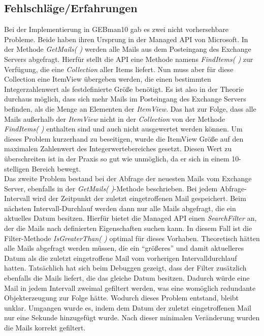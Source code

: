 \subsection{Fehlschläge/Erfahrungen}
\noindent
Bei der Implementierung in GEBman10 gab es zwei nicht vorhersehbare Probleme. Beide haben ihren Ursprung in der Managed API von Microsoft. In der Methode \textit{GetMails( )} werden alle Mails aus dem Posteingang des Exchange Servers abgefragt. Hierfür stellt die API eine Methode namens \textit{FindItems( )} zur Verfügung, die eine \textit{Collection} aller Items liefert. Nun muss aber für diese Collection eine ItemView übergeben werden, die einen bestimmten Integerzahlenwert als festdefinierte Größe benötigt. Es ist also in der Theorie durchaus möglich, dass sich mehr Mails im Posteingang des Exchange Servers befinden, als die Menge an Elementen der \textit{ItemView}. Das hat zur Folge, dass alle Mails außerhalb der \textit{ItemView} nicht in der \textit{Collection} von der Methode \textit{FindItems( )} enthalten sind und auch nicht ausgewertet werden können. Um dieses Problem kurzerhand zu beseitigen, wurde die ItemView Größe auf den maximalen Zahlenwert des Integerwertebereiches gesetzt. Diesen Wert zu überschreiten ist in der Praxis so gut wie unmöglich, da er sich in einem 10-stelligen Bereich bewegt.\\

\noindent
Das zweite Problem bestand bei der Abfrage der neuesten Mails vom Exchange Server, ebenfalls in der \textit{GetMails( )}-Methode beschrieben. Bei jedem Abfrage-Intervall wird der Zeitpunkt der zuletzt eingetroffenen Mail gespeichert. Beim nächsten Intervall-Durchlauf werden dann nur alle Mails abgefragt, die ein aktuelles Datum besitzen. Hierfür bietet die Managed API einen \textit{SearchFilter} an, der die Mails nach definierten Eigenschaften suchen kann. In diesem Fall ist die Filter-Methode \textit{IsGreaterThan( )} optimal für dieses Vorhaben. Theoretisch hätten alle Mails abgefragt werden müssen, die ein \enquote{größeres} und damit aktuelleres Datum als die zuletzt eingetroffene Mail vom vorherigen Intervalldurchlauf hatten. Tatsächlich hat sich beim Debuggen gezeigt, dass der Filter zusätzlich ebenfalls die Mails liefert, die das gleiche Datum besitzen. Dadurch würde eine Mail in jedem Intervall zweimal gefiltert werden, was eine womöglich redundante Objekterzeugung zur Folge hätte. Wodurch dieses Problem entstand, bleibt unklar. Umgangen wurde es, indem dem Datum der zuletzt eingetroffenen Mail nur eine Sekunde hinzugefügt wurde. Nach dieser minimalen Veränderung wurden die Mails korrekt gefiltert.


